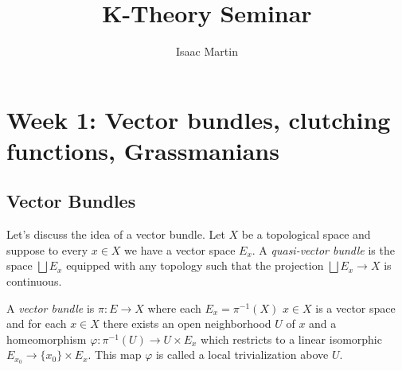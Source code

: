 \documentclass[11pt, raggedright]{tufte-book}
\begin{document}
\newpage
\title{K-Theory Seminar}
\author{Isaac Martin}
\maketitle
\chapter{Week 1: Vector bundles, clutching functions, Grassmanians}
\section{Vector Bundles}
Let's discuss the idea of a vector bundle. Let $X$ be a topological space and suppose to every $x\in X$ we have a vector space $E_x$. A \emph{quasi-vector bundle} is the space $\bigsqcup E_x$ equipped with any topology such that the projection $\bigsqcup E_x \to X$ is continuous.

\begin{defn}\label{defn:vector-bundle}
  A \emph{vector bundle} is $\pi:E\to X$ where each $E_x = \pi^{-1}(X)$ $x\in X$ is a vector space and for each $x\in X$ there exists an open neighborhood $U$ of $x$ and a homeomorphism $\varphi:\pi^{-1}(U) \to U\times E_x$ which restricts to a linear isomorphic $E_{x_0} \to \{x_0\}\times E_x$. This map $\varphi$ is called a local trivialization above $U$.
\end{defn}
\end{document}
